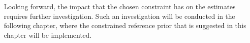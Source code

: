 
Looking forward, %
the impact that the chosen constraint has on the estimates requires further investigation. 
Such an investigation will be conducted in the following chapter, where the constrained reference prior that is suggested in this chapter will be implemented. %
















